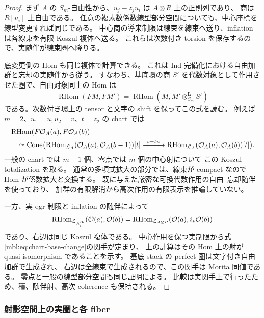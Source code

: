 \begin{proof}
まず $A$ の $S_m$-自由性から、$u_j-z_ju_i$ は $A\otimes R$ 上の正則列であり、
商は $R[u_i]$ 上自由である。
任意の複素数係数線型部分空間についても、中心座標を線型変更すれば同じである。
中心商の導来制限は線束を線束へ送り、inflation は各線束を有限 Koszul 複体へ送る。
これらは次数付き torsion を保存するので、実随伴が線束圏へ降りる。

底変更側の Hom も同じ複体で計算できる。
これは Ind 完備化における自由加群と忘却の実随伴から従う。
すなわち、基底環の商 $S'$ を代数対象として作用させた圏で、自由対象同士の Hom は
\[
 \operatorname{RHom}(F M,F M')
       =\operatorname{RHom}(M,M'\otimes^{\mathbf L}_{S_m}S')
\]
である。次数付き環上の tensor と文字の shift を保ってこの式を読む。
例えば $m=2$、$u_1=u,u_2=v$、$t=z_2$ の chart では
\begin{equation}\label{mbl:eq:one-koszul-hom}
 \begin{split}
 &\operatorname{RHom}(F\mathcal O_A(a),F\mathcal O_A(b))\\
 &\quad\simeq
 \operatorname{Cone}\bigl(
   \operatorname{RHom}_{\mathcal L_A}(\mathcal O_A(a),\mathcal O_A(b-1))[t]
    \xrightarrow{\ v-tu\ }
   \operatorname{RHom}_{\mathcal L_A}(\mathcal O_A(a),\mathcal O_A(b))[t]\bigr).
 \end{split}
\end{equation}
一般の chart では $m-1$ 個、零点では $m$ 個の中心射について
この Koszul totalization を取る。
通常の多項式拡大の部分では、線束が compact なので Hom が係数拡大と交換する。
既に与えた厳密な可換代数作用の自由--忘却随伴を使っており、
加群の有限解消から高次作用の有限表示を推論していない。

一方、実 qgr 制限と inflation の随伴によって
\[
 \operatorname{RHom}_{\mathcal L_{A_i^{\mathrm{ch}}}}
       (\mathcal O(a),\mathcal O(b))
  =\operatorname{RHom}_{\mathcal L_{A\otimes R}}
       (\mathcal O(a),i_*\mathcal O(b))
\]
であり、右辺は同じ Koszul 複体である。
中心作用を保つ実制限から式\eqref{mbl:eq:chart-base-change}の関手が定まり、
上の計算はその Hom 上の射が quasi-isomorphism であることを示す。
基底 stack の perfect 圏は文字付き自由加群で生成され、
右辺は全線束で生成されるので、この関手は Morita 同値である。
零点と一般の線型部分空間も同じ証明による。
比較は実関手上で行ったため、積、随伴射、高次 coherence も保持される。
\end{proof}

\subsubsection{射影空間上の実圏と各 fiber}

